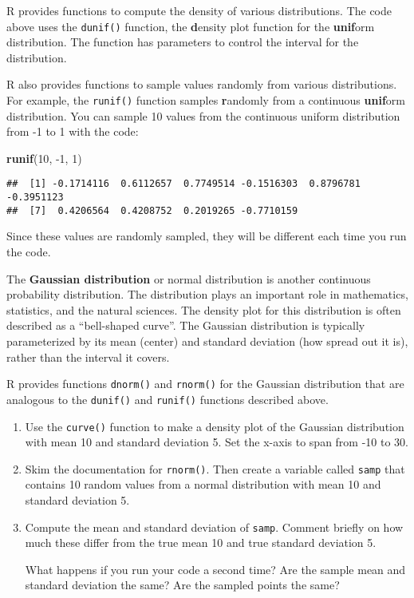 \documentclass[
]{article}
\newenvironment{Shaded}{\begin{snugshade}}{\end{snugshade}}
\newcommand{\DecValTok}[1]{\textcolor[rgb]{0.00,0.00,0.81}{#1}}
\newcommand{\KeywordTok}[1]{\textcolor[rgb]{0.13,0.29,0.53}{\textbf{#1}}}
\newcommand{\NormalTok}[1]{#1}
\begin{document}
R provides functions to compute the density of various distributions.
The code above uses the \texttt{dunif()} function, the \textbf{d}ensity
plot function for the \textbf{unif}orm distribution. The function has
parameters to control the interval for the distribution.

R also provides functions to sample values randomly from various
distributions. For example, the \texttt{runif()} function samples
\textbf{r}andomly from a continuous \textbf{unif}orm distribution. You
can sample 10 values from the continuous uniform distribution from -1 to
1 with the code:

\begin{Shaded}
\begin{Highlighting}[]
\KeywordTok{runif}\NormalTok{(}\DecValTok{10}\NormalTok{, }\DecValTok{{-}1}\NormalTok{, }\DecValTok{1}\NormalTok{)}
\end{Highlighting}
\end{Shaded}

\begin{verbatim}
##  [1] -0.1714116  0.6112657  0.7749514 -0.1516303  0.8796781 -0.3951123
##  [7]  0.4206564  0.4208752  0.2019265 -0.7710159
\end{verbatim}

Since these values are randomly sampled, they will be different each
time you run the code.

The \textbf{Gaussian distribution} or normal distribution is another
continuous probability distribution. The distribution plays an important
role in mathematics, statistics, and the natural sciences. The density
plot for this distribution is often described as a ``bell-shaped
curve''. The Gaussian distribution is typically parameterized by its
mean (center) and standard deviation (how spread out it is), rather than
the interval it covers.

R provides functions \texttt{dnorm()} and \texttt{rnorm()} for the
Gaussian distribution that are analogous to the \texttt{dunif()} and
\texttt{runif()} functions described above.

\begin{enumerate}
\def\labelenumi{\arabic{enumi}.}
\item
  Use the \texttt{curve()} function to make a density plot of the
  Gaussian distribution with mean 10 and standard deviation 5. Set the
  x-axis to span from -10 to 30.
\item
  Skim the documentation for \texttt{rnorm()}. Then create a variable
  called \texttt{samp} that contains 10 random values from a normal
  distribution with mean 10 and standard deviation 5.
\item
  Compute the mean and standard deviation of \texttt{samp}. Comment
  briefly on how much these differ from the true mean 10 and true
  standard deviation 5.

  What happens if you run your code a second time? Are the sample mean
  and standard deviation the same? Are the sampled points the same?
\end{enumerate}
\end{document}
